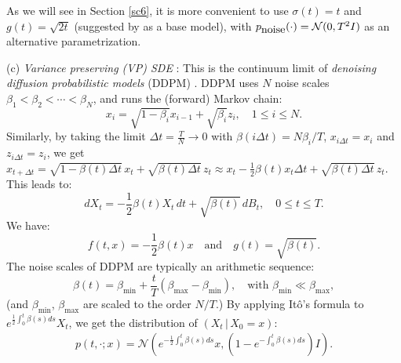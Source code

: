 \documentclass[letterpaper,11pt,reqno]{amsart}
\numberwithin{equation}{section}
\begin{document}
\quad As we will see in Section \ref{sc6}, 
it is more convenient to use 
$\sigma(t) = t$ and $g(t) = \sqrt{2t}$ 
(suggested by \cite{karras2022elucidating} as a base model), 
with $p_{\tiny \mbox{noise}}(\cdot) = \mathcal{N}(0, T^2 I)$ as an alternative parametrization.

\medskip
\noindent
(c) {\em Variance preserving (VP) SDE} \cite{Song20}:
This is the continuum limit of {\em denoising diffusion probabilistic models} (DDPM) \cite{Ho20}.
DDPM uses $N$ noise scales $\beta_1 < \beta_2 < \cdots < \beta_N$,
and runs the (forward) Markov chain:
\begin{equation*}
x_i = \sqrt{1- \beta_i} x_{i-1} + \sqrt{\beta_i} z_i, \quad 1 \le i \le N.
\end{equation*}
Similarly, by taking the limit $\Delta t = \frac{T}{N} \to 0$ with $\beta(i\Delta t) = N \beta_i/T$,
$x_{i\Delta t} = x_i$ and $z_{i\Delta t} = z_i$,
we get
$x_{t+\Delta t} = \sqrt{1 - \beta(t) \Delta t} \, x_t + \sqrt{\beta(t) \Delta t}\, z_t
\approx x_t - \frac{1}{2} \beta(t) x_t \Delta t + \sqrt{\beta(t) \Delta t} \, z_t$.
This leads to:
\begin{equation*}
dX_t = -\frac{1}{2} \beta(t) X_t \, dt + \sqrt{\beta (t)} \, dB_t, \quad 0 \le t \le T.
\end{equation*}
We have:
\begin{equation}
\label{eq:sigbVP}
f(t,x) = -\frac{1}{2}\beta(t) x \quad \mbox{and} \quad g(t) = \sqrt{\beta(t)}.
\end{equation}
The noise scales of DDPM are typically an arithmetic sequence:
\begin{equation}
\label{eq:beta}
\beta(t)= \beta_{\min} + \frac{t}{T}(\beta_{\max} - \beta_{\min}), \quad \mbox{with } \beta_{\min} \ll \beta_{\max},
\end{equation}
(and $\beta_{\min}$, $\beta_{\max}$ are scaled to the order $N/T$.)
By applying It\^o's formula to $e^{\frac{1}{2}\int_0^t \beta(s) ds} X_t$,
we get the distribution of $(X_t \,|\, X_0 = x)$:
\begin{equation}
\label{eq:VPp}
\begin{aligned}
p(t, \cdot;x) = 
 \mathcal{N} \left( e^{-\frac{1}{2} \int_0^t \beta(s) ds} x, (1 - e^{-\int_0^t \beta(s) ds}) I  \right).
\end{aligned}
\end{equation}
\end{document}
